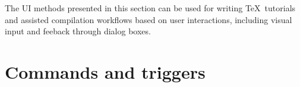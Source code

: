 The UI methods presented in this section can be used for writing \TeX\ tutorials and assisted compilation workflows based on user interactions, including visual input and feeback through dialog boxes.

\section{Commands and triggers}
\label{sec:commandsandtriggers}



